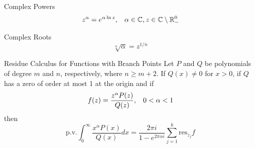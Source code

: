 \documentclass{beamer}
\begin{document}
\begin{frame}
\begin{block}{Complex Powers}
$$z^{\alpha}=e^{\alpha\ln z},\hspace{3mm}\alpha\in\mathbb{C},z\in\mathbb{C}\setminus\mathbb{R}_-^0$$
\end{block}
\begin{block}{Complex Roots}
$$\sqrt[n]{\alpha}=z^{1/n}$$
\end{block}
\end{frame}

\begin{frame}
\begin{block}{Residue Calculus for Functions with Branch Points}
Let $P$ and $Q$ be polynomials of degree $m$ and $n$, respectively, where $n\geqslant m+2$. If $Q(x)\neq0$ for $x>0$, if $Q$ has a zero of order at most 1 at the origin and if
$$f(z)=\dfrac{z^{\alpha}P(z)}{Q(z)},\hspace{3mm}0<\alpha<1$$
then
$$\text{p.v.}\int_0^{\infty}\dfrac{x^{\alpha}P(x)}{Q(x)}dx=\dfrac{2\pi i}{1-e^{2\pi \alpha i}}\sum\limits_{j=1}^k\text{res}_{z_j}f$$
\end{block}
\end{frame}
\end{document}
